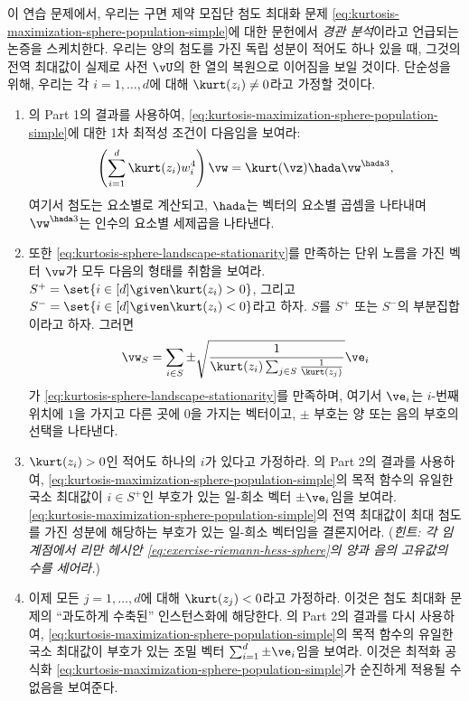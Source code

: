 \documentclass[../../book-main_ko.tex]{subfiles}
\begin{document}
\begin{exercise}\label{exercise:kurtosis-sphere-landscape}
    이 연습 문제에서, 우리는 구면 제약 모집단 첨도 최대화 문제 \eqref{eq:kurtosis-maximization-sphere-population-simple}에 대한 문헌에서 \textit{경관 분석}이라고 언급되는 논증을 스케치한다. 우리는 양의 첨도를 가진 독립 성분이 적어도 하나 있을 때, 그것의 전역 최대값이 실제로 사전 $\vU$의 한 열의 복원으로 이어짐을 보일 것이다. 단순성을 위해, 우리는 각 $i = 1, \dots, d$에 대해 $\kurt(z_i) \neq 0$라고 가정할 것이다.
    \begin{enumerate}
        \item {}의 Part 1의 결과를 사용하여, \eqref{eq:kurtosis-maximization-sphere-population-simple}에 대한 1차 최적성 조건이 다음임을 보여라:
        \begin{equation}\label{eq:kurtosis-sphere-landscape-stationarity}
            \left(\sum_{i=1}^d \kurt(z_i) w_i^4 \right)
            \vw = \kurt(\vz) \hada \vw^{\hada 3},
        \end{equation}
        여기서 첨도는 요소별로 계산되고, $\hada$는 벡터의 요소별 곱셈을 나타내며 $\vw^{\hada 3}$는 인수의 요소별 세제곱을 나타낸다.
        \item 또한 \eqref{eq:kurtosis-sphere-landscape-stationarity}를 만족하는 단위 노름을 가진 벡터 $\vw$가 모두 다음의 형태를 취함을 보여라. $S^+ = \set{i \in [d] \given \kurt(z_i) > 0}$, 그리고 $S^- = \set{i \in [d] \given \kurt(z_i) < 0}$라고 하자. $S$를 $S^+$ 또는 $S^-$의 부분집합이라고 하자. 그러면
        \begin{equation}\label{eq:kurtosis-sphere-landscape-cps}
            \vw_S = \sum_{i \in S} \pm \sqrt{\frac{1}{\kurt(z_i) \sum_{j \in S} \frac{1}{\kurt(z_j)}}} \ve_i
        \end{equation}
        가 \eqref{eq:kurtosis-sphere-landscape-stationarity}를 만족하며, 여기서 $\ve_i$는 $i$-번째 위치에 $1$을 가지고 다른 곳에 $0$을 가지는 벡터이고, $\pm$ 부호는 양 또는 음의 부호의 선택을 나타낸다.
        \item $\kurt(z_i) > 0$인 적어도 하나의 $i$가 있다고 가정하라. 의 Part 2의 결과를 사용하여, \eqref{eq:kurtosis-maximization-sphere-population-simple}의 목적 함수의 유일한 국소 최대값이 $i \in S^+$인 부호가 있는 일-희소 벡터 $\pm \ve_i$임을 보여라. \eqref{eq:kurtosis-maximization-sphere-population-simple}의 전역 최대값이 최대 첨도를 가진 성분에 해당하는 부호가 있는 일-희소 벡터임을 결론지어라. (\textit{힌트: 각 임계점에서 리만 헤시안 \eqref{eq:exercise-riemann-hess-sphere}의 양과 음의 고유값의 수를 세어라.})
        \item 이제 모든 $j =1, \dots, d$에 대해 $\kurt(z_j) < 0$라고 가정하라. 이것은 첨도 최대화 문제의 ``과도하게 수축된'' 인스턴스화에 해당한다. 의 Part 2의 결과를 다시 사용하여, \eqref{eq:kurtosis-maximization-sphere-population-simple}의 목적 함수의 유일한 국소 최대값이 부호가 있는 조밀 벡터 $\sum_{i=1}^d \pm \ve_i$임을 보여라. 이것은 최적화 공식화 \eqref{eq:kurtosis-maximization-sphere-population-simple}가 순진하게 적용될 수 없음을 보여준다.
    \end{enumerate}
\end{exercise}
\end{document}
